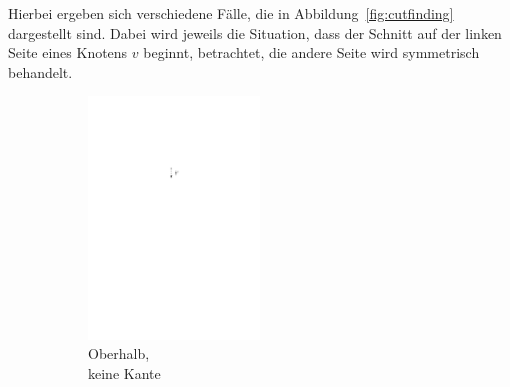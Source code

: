 \documentclass[a4paper]{scrreprt}
\theoremstyle{definition}
\begin{document}
Hierbei ergeben sich verschiedene Fälle, die in Abbildung~\ref{fig:cutfinding} dargestellt sind. Dabei wird jeweils die Situation, dass der Schnitt auf der linken Seite eines Knotens $v$ beginnt, betrachtet, die andere Seite wird symmetrisch behandelt. 

\begin{figure}[h]
        \centering
        \begin{subfigure}[b]{0.2\textwidth}
                \includegraphics[width=0.5\textwidth]{schnitt_finden/top_none}
                \caption{Oberhalb,\\ keine Kante}
                \label{fig:cutfinding_top_none}
        \end{subfigure}%
        \quad
        \begin{subfigure}[b]{0.2\textwidth}

\end{subfigure}
\end{figure}
\end{document}
